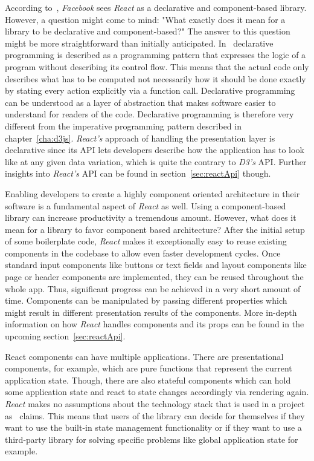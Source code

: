 According to~\cite{React}, \emph{Facebook} sees \emph{React} as a declarative and component-based library. However, a question might come to mind: "What exactly does it mean for a library to be declarative and component-based?" The answer to this question might be more straightforward than initially anticipated. In~\cite{lloyd1994practical} declarative programming is described as a programming pattern that expresses the logic of a program without describing its control flow. This means that the actual code only describes what has to be computed not necessarily how it should be done exactly by stating every action explicitly via a function call. Declarative programming can be understood as a layer of abstraction that makes software easier to understand for readers of the code. Declarative programming is therefore very different from the imperative programming pattern described in chapter~\ref{cha:d3js}. \emph{React's} approach of handling the presentation layer is declarative since its API lets developers describe how the application has to look like at any given data variation, which is quite the contrary to \emph{D3's} API. Further insights into \emph{React's} API can be found in section~\ref{sec:reactApi} though.

Enabling developers to create a highly component oriented architecture in their software is a fundamental aspect of \emph{React} as well. Using a component-based library can increase productivity a tremendous amount. However, what does it mean for a library to favor component based architecture? After the initial setup of some boilerplate code, \emph{React} makes it exceptionally easy to reuse existing components in the codebase to allow even faster development cycles. Once standard input components like buttons or text fields and layout components like page or header components are implemented, they can be reused throughout the whole app. Thus, sig\-nifi\-cant progress can be achieved in a very short amount of time. Components can be manipulated by passing different properties which might result in different presentation results of the components. More in-depth information on how \emph{React} handles components and its props can be found in the upcoming section~\ref{sec:reactApi}.

React components can have multiple applications. There are presentational components, for example, which are pure functions that represent the current application state. Though, there are also stateful components which can hold some application state and react to state changes accordingly via rendering again. \emph{React} makes no assumptions about the technology stack that is used in a project as~\cite{React} claims. This means that users of the library can decide for themselves if they want to use the built-in state management functionality or if they want to use a third-party library for solving specific problems like global application state for example.

